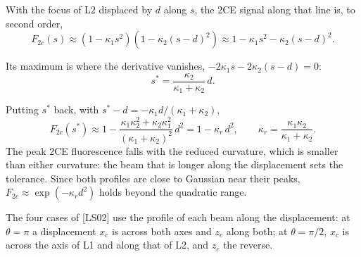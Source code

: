 \documentclass[11pt]{article}
\begin{document}
 With the focus of L2 displaced by $d$ along $s$, the 2CE signal along that line is, to second order,
\begin{equation}F_{2c}(s) \approx (1 - \kappa_1s^2)(1 - \kappa_2(s - d)^2) \approx 1 - \kappa_1s^2 - \kappa_2(s - d)^2 .\end{equation}

 Its maximum is where the derivative vanishes, $-2\kappa_1s - 2\kappa_2(s - d) = 0$:
\begin{equation}s^* = \frac{\kappa_2}{\kappa_1 + \kappa_2}\,d .\end{equation}

 Putting $s^*$ back, with $s^* - d = -\kappa_1d/(\kappa_1 + \kappa_2)$,
\begin{equation}F_{2c}(s^*) \approx 1 - \frac{\kappa_1\kappa_2^2 + \kappa_2\kappa_1^2}{(\kappa_1 + \kappa_2)^2}\,d^2
= 1 - \kappa_r\,d^2,\qquad \kappa_r = \frac{\kappa_1\kappa_2}{\kappa_1 + \kappa_2} .\end{equation}
The peak 2CE fluorescence falls with the reduced curvature, which is smaller than either curvature: the beam that is
longer along the displacement sets the tolerance. Since both profiles are close to Gaussian near their peaks,
$F_{2c} \approx \exp(-\kappa_rd^2)$ holds beyond the quadratic range.

 The four cases of [LS02] use the profile of each beam along the displacement: at $\theta = \pi$ a displacement
$x_c$ is across both axes and $z_c$ along both; at $\theta = \pi/2$, $x_c$ is across the axis of L1 and along that of
L2, and $z_c$ the reverse.
\end{document}
